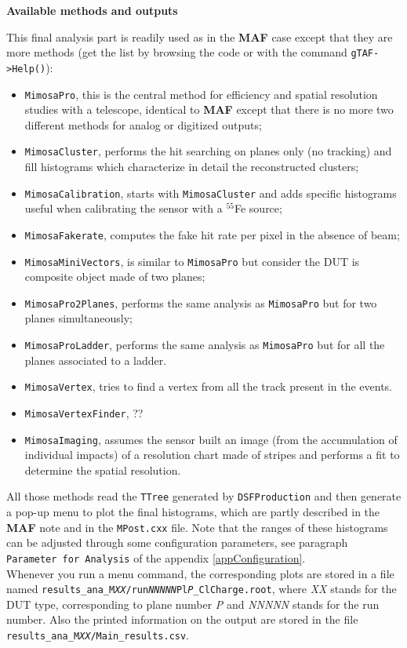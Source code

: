 \documentclass[a4paper, 12pt, twoside]{article}
\newcommand{\MAF}{{\bf MAF }}
\begin{document}
\vspace{0.8 cm}

\noindent
{\bf Available methods and outputs}

\noindent
This final analysis part is readily used as in the \MAF case except that they are more methods (get the list by browsing the code or with the command {\tt gTAF->Help()}):
\begin{itemize}
\item {\tt MimosaPro}, this is the central method for efficiency and spatial resolution studies with a telescope, identical to \MAF except that there is no more two different methods for analog or digitized outputs;
\item {\tt MimosaCluster}, performs the hit searching on planes only (no tracking) and fill histograms which characterize in detail the reconstructed clusters;
\item {\tt MimosaCalibration}, starts with {\tt MimosaCluster} and adds specific histograms useful when calibrating the sensor with a $^{55}$Fe source;
\item {\tt MimosaFakerate}, computes the fake hit rate per pixel in the absence of beam;
\item {\tt MimosaMiniVectors}, is similar to {\tt MimosaPro} but consider the DUT is composite object made of two planes;
\item {\tt MimosaPro2Planes}, performs the same analysis as {\tt MimosaPro} but for two planes simultaneously;
\item {\tt MimosaProLadder}, performs the same analysis as {\tt MimosaPro} but for all the planes associated to a ladder.
\item {\tt MimosaVertex}, tries to find a vertex from all the track present in the events.
\item {\tt MimosaVertexFinder}, ??
\item {\tt MimosaImaging}, assumes the sensor built an image (from the accumulation of individual impacts) of a resolution chart made of stripes and performs a fit to determine the spatial resolution.
\end{itemize}
All those methods read the {\tt TTree} generated by {\tt DSFProduction} and then generate a pop-up menu to plot the final histograms, which are partly described in the \MAF note and in the {\tt MPost.cxx} file. Note that the ranges of these histograms can be adjusted through some configuration parameters, see paragraph {\tt Parameter for Analysis} of the appendix \ref{appConfiguration}.\\
Whenever you run a menu command, the corresponding plots are stored in a file named {\tt results\_ana\_M{\it{XX}}/run{\it{NNNNN}}Pl{\it{P}}\_ClCharge.root}, where {\it{XX}} stands for the DUT type, corresponding to plane number {\it{P}} and {\it{NNNNN}} stands for the run number. Also the printed information on the output are stored in the file {\tt results\_ana\_M{\it{XX}}/Main\_results.csv}.\\
\end{document}

